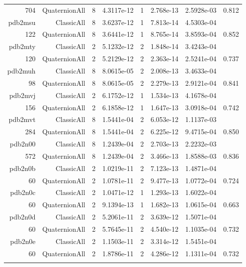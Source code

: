 \begin{xltabular}{\textwidth}{r|rcS[table-format=1.4e+2]cS[table-format=1.3e+2]S[table-format=1.4e+2]S[table-format=-1.3]}
704 & QuaternionAll & 8 & 4.3117e-12 & 1 & 2.768e-13 & 2.5928e-03 & 0.812\\  \addlinespace
pdb2msu & ClassicAll & 8 & 3.6237e-12 & 1 & 7.813e-14 & 4.5303e-04 & \\
122 & QuaternionAll & 8 & 3.6441e-12 & 1 & 8.765e-14 & 3.8593e-04 & 0.852\\  \addlinespace
pdb2mty & ClassicAll & 2 & 5.1232e-12 & 2 & 1.848e-14 & 3.4243e-04 & \\
120 & QuaternionAll & 2 & 5.2129e-12 & 2 & 2.363e-14 & 2.5241e-04 & 0.737\\  \addlinespace
pdb2muh & ClassicAll & 8 & 8.0615e-05 & 2 & 2.008e-13 & 3.4633e-04 & \\
98 & QuaternionAll & 8 & 8.0615e-05 & 2 & 2.279e-13 & 2.9121e-04 & 0.841\\  \addlinespace
pdb2mvj & ClassicAll & 2 & 6.1752e-12 & 1 & 1.534e-13 & 4.1678e-04 & \\
156 & QuaternionAll & 2 & 6.1858e-12 & 1 & 1.647e-13 & 3.0918e-04 & 0.742\\  \addlinespace
pdb2mvt & ClassicAll & 8 & 1.5441e-04 & 2 & 6.053e-12 & 1.1137e-03 & \\
284 & QuaternionAll & 8 & 1.5441e-04 & 2 & 6.225e-12 & 9.4715e-04 & 0.850\\  \addlinespace
pdb2n00 & ClassicAll & 8 & 1.2439e-04 & 2 & 2.703e-13 & 2.2232e-03 & \\
572 & QuaternionAll & 8 & 1.2439e-04 & 2 & 3.466e-13 & 1.8588e-03 & 0.836\\  \addlinespace
pdb2n0b & ClassicAll & 2 & 1.0219e-11 & 2 & 7.123e-13 & 1.4871e-04 & \\
60 & QuaternionAll & 2 & 1.0781e-11 & 2 & 9.477e-13 & 1.0772e-04 & 0.724\\  \addlinespace
pdb2n0c & ClassicAll & 2 & 1.0471e-12 & 1 & 1.293e-13 & 1.6022e-04 & \\
60 & QuaternionAll & 2 & 9.1394e-13 & 1 & 1.682e-13 & 1.0615e-04 & 0.663\\  \addlinespace
pdb2n0d & ClassicAll & 2 & 5.2061e-11 & 2 & 3.639e-12 & 1.5071e-04 & \\
60 & QuaternionAll & 2 & 5.7645e-11 & 2 & 4.540e-12 & 1.1035e-04 & 0.732\\  \addlinespace
pdb2n0e & ClassicAll & 2 & 1.1503e-11 & 2 & 3.314e-12 & 1.5451e-04 & \\
60 & QuaternionAll & 2 & 1.8786e-11 & 2 & 4.286e-12 & 1.1311e-04 & 0.732\\  \addlinespace

\end{xltabular}
